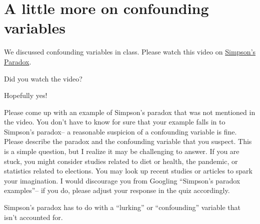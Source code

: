 \documentclass[assignment03_Solutions]{subfiles}
\begin{document}
\section{A little more on confounding variables}
We discussed confounding variables in class. Please watch this video on \href{https://www.youtube.com/watch?v=sxYrzzy3cq8}{Simpson's Paradox}.

\vspace{1em}
\begin{exercise}[(15 minutes)]
\bes
\item Did you watch the video?
\begin{boxedsolution}
Hopefully yes!
\end{boxedsolution}


\item Please come up with an example of Simpson's paradox that was not mentioned in the video. You don't have to know for sure that your example falls in to Simpson's paradox-- a reasonable suspicion of a confounding variable is fine. Please describe the paradox and the confounding variable that you suspect. This is a simple question, but I realize it may be challenging to answer. If you are stuck, you might consider studies related to diet or health, the pandemic, or statistics related to elections. You may look up recent studies or articles to spark your imagination. I would discourage you from Googling ``Simpson's paradox examples''-- if you do, please adjust your response in the quiz accordingly.
 \begin{boxedsolution}
 Simpson's paradox has to do with a ``lurking'' or ``confounding'' variable that isn't accounted for. 
\end{boxedsolution}

\ees

\end{exercise}

\end{document}
